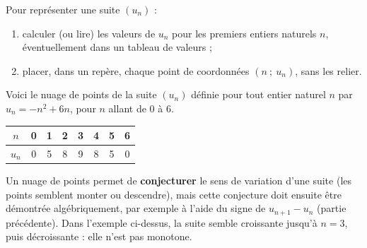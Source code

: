\documentclass[10pt,a4paper]{article}
\begin{document}
\begin{met}
    Pour représenter une suite \((u_n)\) :
    \begin{enumerate}
        \item calculer (ou lire) les valeurs de \(u_n\) pour les premiers entiers naturels \(n\), éventuellement dans un tableau de valeurs ;
        \item placer, dans un repère, chaque point de coordonnées \((n\ ;\ u_n)\), sans les relier.
    \end{enumerate}
\end{met}

\begin{exple}
    Voici le nuage de points de la suite \((u_n)\) définie pour tout entier naturel \(n\) par \(u_n = -n^2+6n\), pour \(n\) allant de \(0\) à \(6\).

    \begin{center}
    \begin{tabular}{|c|c|c|c|c|c|c|c|}
        \hline
        \(n\) & 0 & 1 & 2 & 3 & 4 & 5 & 6 \\
        \hline
        \(u_n\) & 0 & 5 & 8 & 9 & 8 & 5 & 0 \\
        \hline
    \end{tabular}
    \end{center}

    \begin{center}
    \end{center}
\end{exple}

\begin{rem}
    Un nuage de points permet de \textbf{conjecturer} le sens de variation d'une suite (les points semblent monter ou descendre), mais cette conjecture doit ensuite être démontrée algébriquement, par exemple à l'aide du signe de \(u_{n+1}-u_n\) (partie précédente). Dans l'exemple ci-dessus, la suite semble croissante jusqu'à \(n=3\), puis décroissante : elle n'est pas monotone.
\end{rem}

\end{document}
